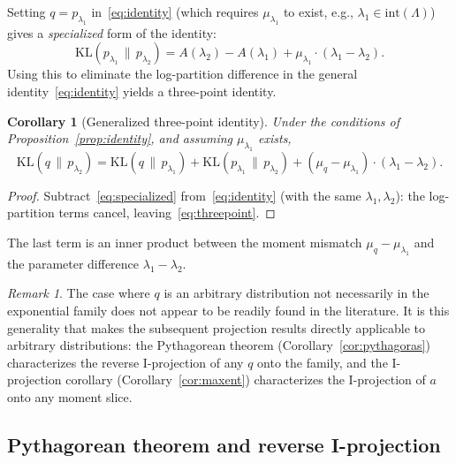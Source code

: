 \documentclass[11pt, a4paper, 
onecolumn, 
showabstract]{naverlabseurope-onecol-flex}
\newtheorem{corollary}[theorem]{Corollary}
\theoremstyle{definition}
\theoremstyle{remark}
\newtheorem{remark}[theorem]{Remark}
\newcommand{\KL}[2]{\mathrm{KL}\!\left(#1 \,\|\, #2\right)}
\begin{document}
Setting $q = p_{\lambda_1}$ in~\eqref{eq:identity} (which requires $\mu_{\lambda_1}$ to exist, e.g., $\lambda_1 \in \mathrm{int}(\Lambda)$) gives a \emph{specialized} form of the identity:
\begin{equation}\label{eq:specialized}
    \KL{p_{\lambda_1}}{p_{\lambda_2}}
    = A(\lambda_2) - A(\lambda_1) + \mu_{\lambda_1} \cdot (\lambda_1 - \lambda_2).
\end{equation}
Using this to eliminate the log-partition difference in the general identity~\eqref{eq:identity} yields a three-point identity.

\begin{corollary}[Generalized three-point identity]\label{cor:threepoint}
Under the conditions of Proposition~\ref{prop:identity}, and assuming $\mu_{\lambda_1}$ exists,
\begin{equation}\label{eq:threepoint}
    \KL{q}{p_{\lambda_2}}
    = \KL{q}{p_{\lambda_1}} + \KL{p_{\lambda_1}}{p_{\lambda_2}}
      + (\mu_q - \mu_{\lambda_1}) \cdot (\lambda_1 - \lambda_2).
\end{equation}
\end{corollary}

\begin{proof}
Subtract~\eqref{eq:specialized} from~\eqref{eq:identity} (with the same $\lambda_1, \lambda_2$):
the log-partition terms cancel, leaving~\eqref{eq:threepoint}.
\end{proof}

The last term is an inner product between the moment mismatch $\mu_q - \mu_{\lambda_1}$ and the parameter difference $\lambda_1 - \lambda_2$.

\begin{remark}
The case where $q$ is an arbitrary distribution not necessarily in the exponential family does not appear to be readily found in the literature.
It is this generality that makes the subsequent projection results directly applicable to arbitrary distributions: the Pythagorean theorem (Corollary~\ref{cor:pythagoras}) characterizes the reverse I-projection of any $q$ onto the family, and the I-projection corollary (Corollary~\ref{cor:maxent}) characterizes the I-projection of $a$ onto any moment slice.
\end{remark}

\subsection{Pythagorean theorem and reverse I-projection}\label{sec:pythagoras}
\end{document}
